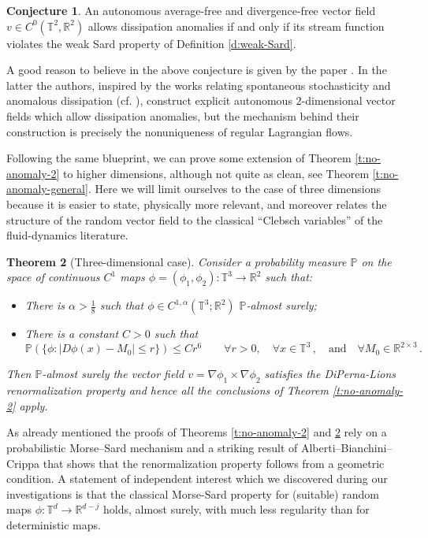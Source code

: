 \documentclass[11pt,reqno]{amsart}
\newtheorem{theorem}{Theorem}[section]
\theoremstyle{definition}
\newtheorem{conjecture}[theorem]{Conjecture}
\numberwithin{equation}{section}
\begin{document}
\begin{conjecture}
An autonomous average-free and divergence-free vector field $v\in C^0 (\mathbb T^2, \mathbb R^2)$ allows dissipation anomalies if and only if its stream function violates the weak Sard property of Definition \ref{d:weak-Sard}.
\end{conjecture}

A good reason to believe in the above conjecture is given by the paper \cite{JohanssonSorella2024}. In the latter the authors, inspired by the works relating spontaneous stochasticity and anomalous dissipation (cf. \cite{Drivas}), construct explicit autonomous $2$-dimensional vector fields which allow dissipation anomalies, but the mechanism behind their construction is precisely the nonuniqueness of regular Lagrangian flows.

\medskip

Following the same blueprint, we can prove some extension of Theorem \ref{t:no-anomaly-2} to higher dimensions, although not quite as clean, see Theorem \ref{t:no-anomaly-general}. Here we will limit ourselves to the case of three dimensions because it is easier to state, physically more relevant, and moreover relates the structure of the random vector field to the classical ``Clebsch variables'' of the fluid-dynamics literature. 

\begin{theorem}[Three-dimensional case]\label{t:no-anomaly-3}
Consider a probability measure $\mathbb P$ on the space of continuous $C^1$ maps $\phi = (\phi_1, \phi_2): \mathbb T^3 \to \mathbb R^2$ such that:
\begin{itemize}
\item[(a)] There is $\alpha > \frac{1}{8}$ such that $\phi \in C^{1,\alpha} (\mathbb{T}^3 ; \mathbb{R}^2)$ $\mathbb{P}$-almost surely;
\item[(b)] There is a constant $C>0$ such that
\[
\mathbb P (\{\phi: |D\phi (x) - M_0|\leq r\}) \leq C r^6 \qquad \forall r>0, \quad \forall x\in \mathbb T^3\, ,\quad\mbox{and} \quad \forall M_0 \in \mathbb R^{2\times 3}\, .
\]
\end{itemize}
Then $\mathbb{P}$-almost surely the vector field $v = \nabla \phi_1 \times \nabla \phi_2$ satisfies the DiPerna-Lions renormalization property and hence all the conclusions of Theorem \ref{t:no-anomaly-2} apply. 
\end{theorem}

As already mentioned the proofs of Theorems \ref{t:no-anomaly-2} and \ref{t:no-anomaly-3} rely on a probabilistic Morse--Sard mechanism and a striking result of Alberti--Bianchini--Crippa \cite{AlbertiBianchiniCrippa2014} that shows that the renormalization property follows from a geometric condition. A statement of independent interest which we discovered during our investigations is that the classical Morse-Sard property for (suitable) random maps $\phi: \mathbb T^d \to \mathbb R^{d-j}$ holds, almost surely, with much less regularity than for deterministic maps.
\end{document}
